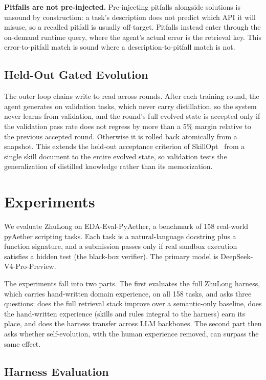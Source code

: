 \documentclass[conference]{IEEEtran}
\begin{document}
\textbf{Pitfalls are not pre-injected.}
Pre-injecting pitfalls alongside solutions is unsound by construction: a task's description does not predict which API it will misuse, so a recalled pitfall is usually off-target. Pitfalls instead enter through the on-demand runtime query, where the agent's actual error is the retrieval key. This error-to-pitfall match is sound where a description-to-pitfall match is not.

\subsection{Held-Out Gated Evolution}
\label{sec:se_loop}

The outer loop chains write to read across rounds. After each training round, the agent generates on validation tasks, which never carry distillation, so the system never learns from validation, and the round's full evolved state is accepted only if the validation pass rate does not regress by more than a 5\% margin relative to the previous accepted round. Otherwise it is rolled back atomically from a snapshot. This extends the held-out acceptance criterion of SkillOpt~\cite{yang2026skillopt} from a single skill document to the entire evolved state, so validation tests the generalization of distilled knowledge rather than its memorization.


\section{Experiments}
\label{sec:experiments}

We evaluate ZhuLong on EDA-Eval-PyAether, a benchmark of 158 real-world pyAether scripting tasks. Each task is a natural-language docstring plus a function signature, and a submission passes only if real sandbox execution satisfies a hidden test (the black-box verifier). The primary model is
DeepSeek-V4-Pro-Preview.

The experiments fall into two parts. The first evaluates the full ZhuLong harness, which carries hand-written domain experience, on all 158 tasks, and asks three questions: does the full retrieval stack improve over a semantic-only baseline, does the hand-written experience (skills and rules
integral to the harness) earn its place, and does the harness transfer across LLM backbones. The second part then asks whether self-evolution, with the human experience removed, can surpass the same effect.

\subsection{Harness Evaluation}
\label{sec:exp_retrieval}
\end{document}
